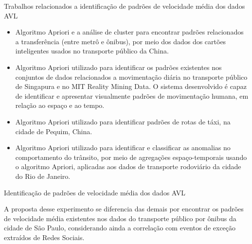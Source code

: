\documentclass{beamer}
\begin{document}
\begin{frame}{Trabalhos relacionados a identificação de padrões de velocidade média dos dados AVL}
\begin{itemize}
    \item Algoritmo Apriori e a análise de cluster para encontrar padrões relacionados a transferência (entre metrô e ônibus), por meio dos dados dos cartões inteligentes usados no transporte público da China.
    \item Algoritmo Apriori utilizado para identificar os padrões existentes nos conjuntos de dados relacionados a movimentação diária no transporte público de Singapura e no MIT Reality Mining Data. O sistema desenvolvido é capaz de identificar e apresentar visualmente padrões de movimentação humana, em relação ao espaço e ao tempo. 
    \item Algoritmo Apriori utilizado para identificar padrões de rotas de táxi, na cidade de Pequim, China.
    \item Algoritmo Apriori utilizado para identificar e classificar as anomalias no comportamento do trânsito, por meio de agregações espaço-temporais usando o algoritmo Apriori, aplicadas aos dados de transporte rodoviário da cidade do Rio de Janeiro.
\end{itemize}
\end{frame}
\begin{frame}{Identificação de padrões de velocidade média dos dados AVL}
\begin{block}{}
        A proposta desse experimento se diferencia das demais por encontrar os padrões de velocidade média existentes nos dados do transporte público por ônibus da cidade de São Paulo, considerando ainda a correlação com eventos de exceção extraídos de Redes Sociais.
\end{block}
\end{frame}
\end{document}
